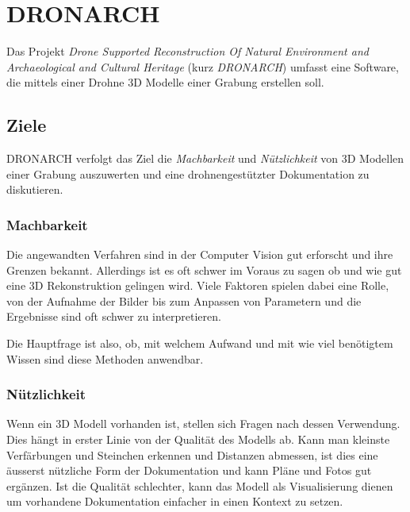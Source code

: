 \documentclass{paper}
\begin{document}
	\section{DRONARCH}
		Das Projekt \emph{Drone Supported Reconstruction Of Natural Environment and Archaeological and Cultural Heritage} (kurz \emph{DRONARCH}) umfasst eine Software, die mittels einer Drohne 3D Modelle einer Grabung erstellen soll.
		
		\subsection{Ziele} \label{einf:ziele}
			DRONARCH verfolgt das Ziel die \emph{Machbarkeit} und \emph{Nützlichkeit} von 3D Modellen einer Grabung auszuwerten und eine drohnengestützter Dokumentation zu diskutieren.
				
			\subsubsection{Machbarkeit}
				Die angewandten Verfahren sind in der Computer Vision gut erforscht und ihre Grenzen bekannt. Allerdings ist es oft schwer im Voraus zu sagen ob und wie gut eine 3D Rekonstruktion gelingen wird. Viele Faktoren spielen dabei eine Rolle, von der Aufnahme der Bilder bis zum Anpassen von Parametern und die Ergebnisse sind oft schwer zu interpretieren.
				
				Die Hauptfrage ist also, ob, mit welchem Aufwand und mit wie viel benötigtem Wissen sind diese Methoden anwendbar.
			
			\subsubsection{Nützlichkeit}
				Wenn ein 3D Modell vorhanden ist, stellen sich Fragen nach dessen Verwendung.
				Dies hängt in erster Linie von der Qualität des Modells ab. Kann man kleinste Verfärbungen und Steinchen erkennen und Distanzen abmessen, ist dies eine äusserst nützliche Form der Dokumentation und kann Pläne und Fotos gut ergänzen.
				Ist die Qualität schlechter, kann das Modell als Visualisierung dienen um vorhandene Dokumentation einfacher in einen Kontext zu setzen.
\end{document}
